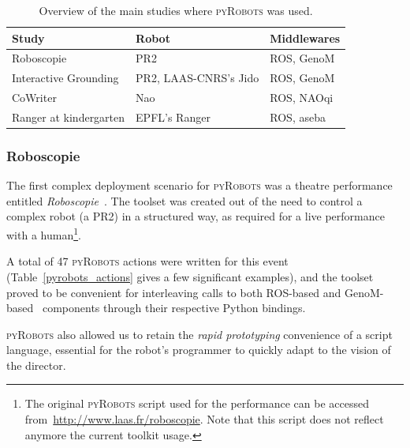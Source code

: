 \documentclass[a4paper, 10pt, conference]{ieeeconf}      %
\newcommand{\pyRobots}{\textsc{pyRobots}}
\begin{document}
\begin{table}[h]
    \centering
    \begin{tabular}{lll}
        \toprule
        Study                 & Robot & Middlewares \\ \midrule
        Roboscopie            & PR2       & ROS, {\sc GenoM} \\
        Interactive Grounding & PR2, LAAS-CNRS's Jido & ROS, {\sc GenoM} \\
        CoWriter              & Nao       & ROS, NAOqi  \\
        Ranger at kindergarten & EPFL's Ranger & ROS, aseba  \\
        \bottomrule
    \end{tabular}
    \caption{Overview of the main studies where \pyRobots{} was used.}
\end{table}

\subsubsection{Roboscopie} The first complex deployment scenario for \pyRobots{} was
a theatre performance entitled \emph{Roboscopie}~\cite{lemaignan2012roboscopie}.
The toolset was created out of the need to control a complex robot (a PR2) in a structured way, as required for a live performance with a
human\footnote{The original \pyRobots{} script used for the performance can be
accessed from~\url{http://www.laas.fr/roboscopie}. Note that this script does
not reflect anymore the current toolkit usage.}.

A total of 47 \pyRobots{} actions were written for this event
(Table~\ref{pyrobots_actions} gives a few significant examples), and the toolset
proved to be convenient for interleaving calls to both ROS-based and
{\sc GenoM}-based~\cite{mallet2010genom3} components through their respective
Python bindings.

\pyRobots{} also allowed us to retain the \emph{rapid prototyping} convenience
of a script language, essential for the robot's programmer to quickly adapt to
the vision of the director.
\end{document}
